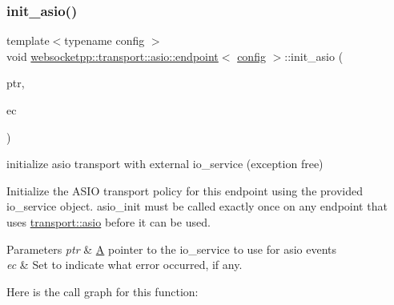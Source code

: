 \subsubsection{\texorpdfstring{init\+\_\+asio()}{init\_asio()}\hspace{0.1cm}{\footnotesize\ttfamily [1/4]}}
{\footnotesize\ttfamily template$<$typename config $>$ \\
void \mbox{\hyperlink{classwebsocketpp_1_1transport_1_1asio_1_1endpoint}{websocketpp\+::transport\+::asio\+::endpoint}}$<$ \mbox{\hyperlink{classconfig}{config}} $>$\+::init\+\_\+asio (\begin{DoxyParamCaption}\item[{\mbox{\hyperlink{classwebsocketpp_1_1transport_1_1asio_1_1endpoint_acc7e89c6427514628f551cf3f795b7e0}{io\+\_\+service\+\_\+ptr}}}]{ptr,  }\item[{lib\+::error\+\_\+code \&}]{ec }\end{DoxyParamCaption})\hspace{0.3cm}{\ttfamily [inline]}}



initialize asio transport with external io\+\_\+service (exception free) 

Initialize the A\+S\+IO transport policy for this endpoint using the provided io\+\_\+service object. asio\+\_\+init must be called exactly once on any endpoint that uses \mbox{\hyperlink{namespacewebsocketpp_1_1transport_1_1asio}{transport\+::asio}} before it can be used.


\begin{DoxyParams}{Parameters}
{\em ptr} & \mbox{\hyperlink{struct_a}{A}} pointer to the io\+\_\+service to use for asio events \\
\hline
{\em ec} & Set to indicate what error occurred, if any. \\
\hline
\end{DoxyParams}
Here is the call graph for this function\+:
\mbox{\label{classwebsocketpp_1_1transport_1_1asio_1_1endpoint_a320fc4ea3a151afaf8b973ce32effd25}} 

